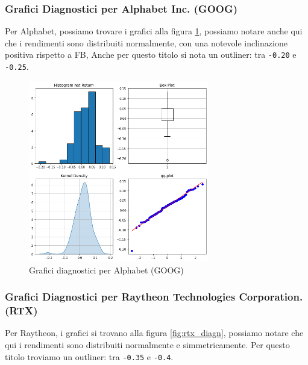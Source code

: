 \documentclass{article}
\begin{document}
\pagebreak

\subsubsection{Grafici Diagnostici per Alphabet Inc. (GOOG)}

Per Alphabet, possiamo trovare i grafici alla figura \ref{fig:goog_diagn}, possiamo notare anche qui che i rendimenti sono distribuiti normalmente, con una notevole inclinazione positiva rispetto a FB,
Anche per questo titolo si nota un outliner: tra \verb|-0.20| e \verb|-0.25|.

\vspace{3cm}

\begin{figure}[h]
  \centering
  \includegraphics[width=0.7\textwidth]{goog_tecn.png}
  \caption{Grafici diagnostici per Alphabet (GOOG)}
  \label{fig:goog_diagn}
\end{figure}

\pagebreak

\subsubsection{Grafici Diagnostici per Raytheon Technologies Corporation. (RTX)}

Per Raytheon, i grafici si trovano alla figura \ref{fig:rtx_diagn}, possiamo notare che qui i rendimenti sono distribuiti normalmente e simmetricamente.
Per questo titolo troviamo un outliner: tra \verb|-0.35| e \verb|-0.4|.

\vspace{3cm}
\end{document}
